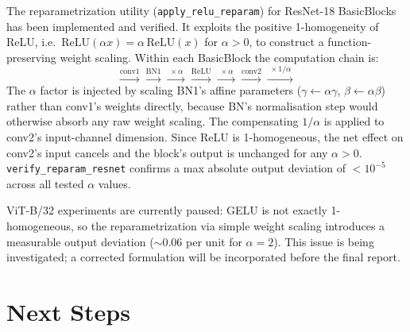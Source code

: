 \documentclass{article}
\begin{document}
The reparametrization utility (\texttt{apply\_relu\_reparam}) for ResNet-18 BasicBlocks has been implemented and verified.  It exploits the positive 1-homogeneity of ReLU, i.e.\ $\mathrm{ReLU}(\alpha x) = \alpha\,\mathrm{ReLU}(x)$ for $\alpha > 0$, to construct a function-preserving weight scaling.  Within each BasicBlock the computation chain is:
\[
  \xrightarrow{\text{conv1}} \xrightarrow{\text{BN1}} \xrightarrow{\;\times\alpha\;} \xrightarrow{\text{ReLU}} \xrightarrow{\;\times\alpha\;} \xrightarrow{\text{conv2}} \xrightarrow{\;\times 1/\alpha\;}
\]
The $\alpha$ factor is injected by scaling BN1's affine parameters ($\gamma \leftarrow \alpha\gamma$, $\beta \leftarrow \alpha\beta$) rather than conv1's weights directly, because BN's normalisation step would otherwise absorb any raw weight scaling.  The compensating $1/\alpha$ is applied to conv2's input-channel dimension.  Since ReLU is 1-homogeneous, the net effect on conv2's input cancels and the block's output is unchanged for any $\alpha > 0$.  \texttt{verify\_reparam\_resnet} confirms a max absolute output deviation of $< 10^{-5}$ across all tested $\alpha$ values.

ViT-B/32 experiments are currently paused: GELU is not exactly 1-homogeneous, so the reparametrization via simple weight scaling introduces a measurable output deviation ($\sim$0.06 per unit for $\alpha=2$). This issue is being investigated; a corrected formulation will be incorporated before the final report.
\section{Next Steps}
\end{document}
